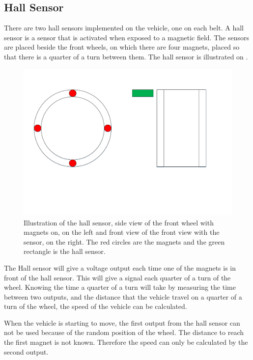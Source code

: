 \subsection{Hall Sensor}

There are two hall sensors implemented on the vehicle, one on each belt. A hall sensor is a sensor that is activated when exposed to a magnetic field. The sensors are placed beside the front wheels, on which there are four magnets, placed so that there is a quarter of a turn between them. The hall sensor is illustrated on .

 \begin{figure}[H]
	\centering
	\includegraphics[scale=0.5]{figures/HallSensorSide_Forward_view.pdf}
	\caption{Illustration of the hall sensor, side view of the front wheel with magnets on, on the left and front view of the front view with the sensor, on the right. The red circles are the magnets and the green rectangle is the hall sensor.}
	\label{HallSensor}
\end{figure}

The Hall sensor will give a voltage output each time one of the magnets is in front of the hall sensor. This will give a signal each quarter of a turn of the wheel. Knowing the time a quarter of a turn will take by measuring the time between two outputs, and the distance that the vehicle travel on a quarter of a turn of the wheel, the speed of the vehicle can be calculated.

When the vehicle is starting to move, the first output from the hall sensor can not be used because of the random position of the wheel. The distance to reach the first magnet is not known. Therefore the speed can only be calculated by the second output.